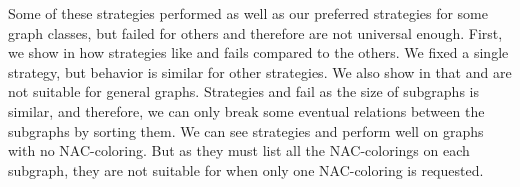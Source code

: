Some of these strategies performed as well as our preferred strategies for some graph classes,
but failed for others and therefore are not universal enough.
%
First, we show in 
how strategies like \Log{} and \PromisingCycles{} fails compared to the others.
We fixed a single strategy, but behavior is similar for other strategies.
We also show in 
that \KernighanLin{} and \Cuts{} are not suitable for general graphs.
%
Strategies \SortedBits{} and \MinMax{} fail as the size of subgraphs is similar,
and therefore, we can only break some eventual relations between the subgraphs by sorting them.
%
We can see strategies \SortedSize{} and \Score{} perform well
on graphs with no NAC-coloring. But as they must list all the NAC-colorings
on each subgraph, they are not suitable for when only one NAC-coloring is requested.



